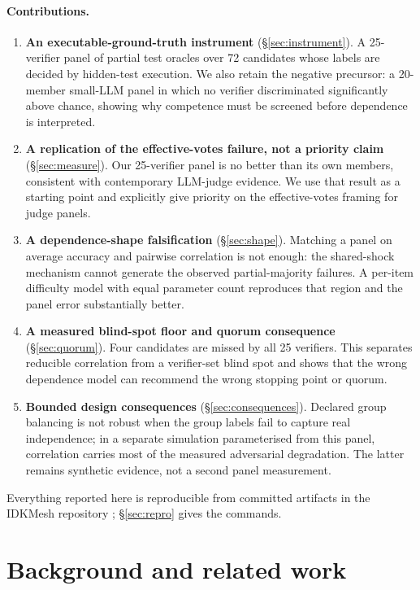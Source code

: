 \documentclass[11pt,a4paper]{article}
\begin{document}
\paragraph{Contributions.}
\begin{enumerate}
\item \textbf{An executable-ground-truth instrument} (\S\ref{sec:instrument}).
  A 25-verifier panel of partial test oracles over 72 candidates whose labels
  are decided by hidden-test execution. We also retain the negative precursor:
  a 20-member small-LLM panel in which no verifier discriminated significantly
  above chance, showing why competence must be screened before dependence is
  interpreted.
\item \textbf{A replication of the effective-votes failure, not a priority claim}
  (\S\ref{sec:measure}). Our 25-verifier panel is no better than its own members,
  consistent with contemporary LLM-judge evidence. We use that result as a
  starting point and explicitly give \citet{kohli2026} priority on the
  effective-votes framing for judge panels.
\item \textbf{A dependence-shape falsification} (\S\ref{sec:shape}). Matching a
  panel on average accuracy and pairwise correlation is not enough: the
  shared-shock mechanism cannot generate the observed partial-majority failures.
  A per-item difficulty model with equal parameter count reproduces that region
  and the panel error substantially better.
\item \textbf{A measured blind-spot floor and quorum consequence}
  (\S\ref{sec:quorum}). Four candidates are missed by all 25 verifiers. This
  separates reducible correlation from a verifier-set blind spot and shows that
  the wrong dependence model can recommend the wrong stopping point or quorum.
\item \textbf{Bounded design consequences} (\S\ref{sec:consequences}). Declared
  group balancing is not robust when the group labels fail to capture real
  independence; in a separate simulation parameterised from this panel,
  correlation carries most of the measured adversarial degradation. The latter
  remains synthetic evidence, not a second panel measurement.
\end{enumerate}

Everything reported here is reproducible from committed artifacts in the IDKMesh
repository \citep{idkmesh}; \S\ref{sec:repro} gives the commands.

\section{Background and related work}
\label{sec:related}
\end{document}
